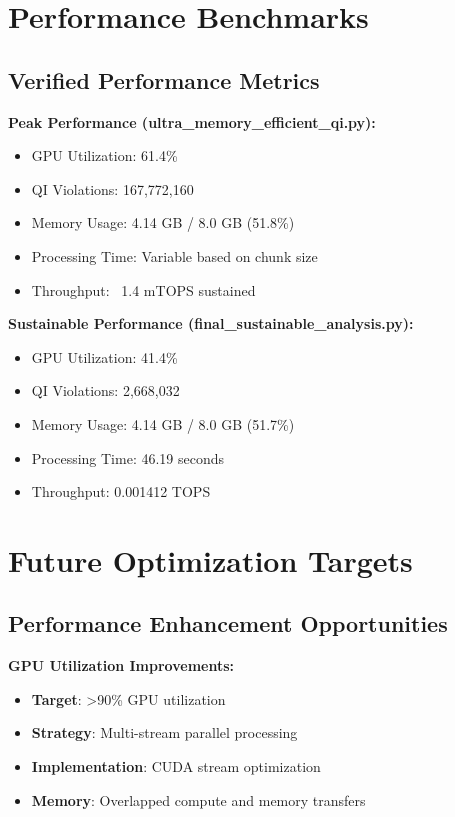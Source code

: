 \documentclass[11pt]{article}
\begin{document}
\section{Performance Benchmarks}

\subsection{Verified Performance Metrics}

\textbf{Peak Performance (ultra\_memory\_efficient\_qi.py):}
\begin{itemize}
    \item GPU Utilization: 61.4\%
    \item QI Violations: 167,772,160
    \item Memory Usage: 4.14 GB / 8.0 GB (51.8\%)
    \item Processing Time: Variable based on chunk size
    \item Throughput: ~1.4 mTOPS sustained
\end{itemize}

\textbf{Sustainable Performance (final\_sustainable\_analysis.py):}
\begin{itemize}
    \item GPU Utilization: 41.4\%
    \item QI Violations: 2,668,032
    \item Memory Usage: 4.14 GB / 8.0 GB (51.7\%)
    \item Processing Time: 46.19 seconds
    \item Throughput: 0.001412 TOPS
\end{itemize}

\section{Future Optimization Targets}

\subsection{Performance Enhancement Opportunities}

\textbf{GPU Utilization Improvements:}
\begin{itemize}
    \item \textbf{Target}: >90\% GPU utilization
    \item \textbf{Strategy}: Multi-stream parallel processing
    \item \textbf{Implementation}: CUDA stream optimization
    \item \textbf{Memory}: Overlapped compute and memory transfers
\end{itemize}
\end{document}
